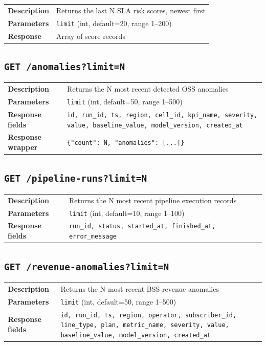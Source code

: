 \begin{tabularx}{\textwidth}{@{}lX@{}}
\toprule
\textbf{Description} & Returns the last N SLA risk scores, newest first \\
\textbf{Parameters} & \texttt{limit} (int, default=20, range 1--200) \\
\textbf{Response} & Array of score records \\
\bottomrule
\end{tabularx}

\subsection{\texttt{GET /anomalies?limit=N}}

\begin{tabularx}{\textwidth}{@{}lX@{}}
\toprule
\textbf{Description} & Returns the N most recent detected OSS anomalies \\
\textbf{Parameters} & \texttt{limit} (int, default=50, range 1--500) \\
\textbf{Response fields} & \texttt{id, run\_id, ts, region, cell\_id, kpi\_name, severity, value, baseline\_value, model\_version, created\_at} \\
\textbf{Response wrapper} & \texttt{\{"count": N, "anomalies": [...]\}} \\
\bottomrule
\end{tabularx}

\subsection{\texttt{GET /pipeline-runs?limit=N}}

\begin{tabularx}{\textwidth}{@{}lX@{}}
\toprule
\textbf{Description} & Returns the N most recent pipeline execution records \\
\textbf{Parameters} & \texttt{limit} (int, default=10, range 1--100) \\
\textbf{Response fields} & \texttt{run\_id, status, started\_at, finished\_at, error\_message} \\
\bottomrule
\end{tabularx}

\subsection{\texttt{GET /revenue-anomalies?limit=N}}

\begin{tabularx}{\textwidth}{@{}lX@{}}
\toprule
\textbf{Description} & Returns the N most recent BSS revenue anomalies \\
\textbf{Parameters} & \texttt{limit} (int, default=50, range 1--500) \\
\textbf{Response fields} & \texttt{id, run\_id, ts, region, operator, subscriber\_id, line\_type, plan, metric\_name, severity, value, baseline\_value, model\_version, created\_at} \\
\bottomrule
\end{tabularx}

